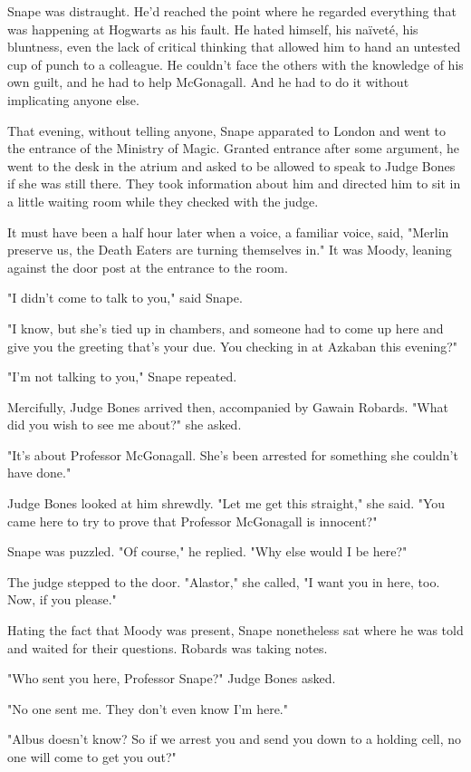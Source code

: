 Snape was distraught. He'd reached the point where he regarded everything that was happening at Hogwarts as his fault. He hated himself, his naïveté, his bluntness, even the lack of critical thinking that allowed him to hand an untested cup of punch to a colleague. He couldn't face the others with the knowledge of his own guilt, and he had to help McGonagall. And he had to do it without implicating anyone else.

That evening, without telling anyone, Snape apparated to London and went to the entrance of the Ministry of Magic. Granted entrance after some argument, he went to the desk in the atrium and asked to be allowed to speak to Judge Bones if she was still there. They took information about him and directed him to sit in a little waiting room while they checked with the judge.

It must have been a half hour later when a voice, a familiar voice, said, "Merlin preserve us, the Death Eaters are turning themselves in." It was Moody, leaning against the door post at the entrance to the room.

"I didn't come to talk to you," said Snape.

"I know, but she's tied up in chambers, and someone had to come up here and give you the greeting that's your due. You checking in at Azkaban this evening?"

"I'm not talking to you," Snape repeated.

Mercifully, Judge Bones arrived then, accompanied by Gawain Robards. "What did you wish to see me about?" she asked.

"It's about Professor McGonagall. She's been arrested for something she couldn't have done."

Judge Bones looked at him shrewdly. "Let me get this straight," she said. "You came here to try to prove that Professor McGonagall is innocent?"

Snape was puzzled. "Of course," he replied. "Why else would I be here?"

The judge stepped to the door. "Alastor," she called, "I want you in here, too. Now, if you please."

Hating the fact that Moody was present, Snape nonetheless sat where he was told and waited for their questions. Robards was taking notes.

"Who sent you here, Professor Snape?" Judge Bones asked.

"No one sent me. They don't even know I'm here."

"Albus doesn't know? So if we arrest you and send you down to a holding cell, no one will come to get you out?"

